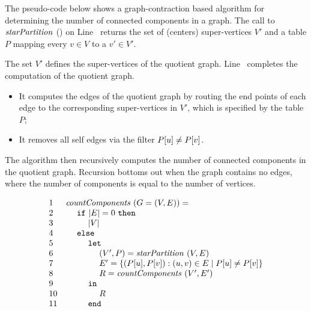 \begin{flex}
\begin{algorithm}
\label{alg:graphcon::connect::cc}

The pseudo-code below shows a graph-contraction based algorithm for
determining the number of connected components in a graph.
%
The call to $\mathit{starPartition}$ () on
Line~\linegcconnectccpartition{} returns the set of (centers)
super-vertices $V'$ and a table $P$ mapping every $v \in V$ to a $v'
\in V'$.
%


%
The set $V'$ defines the super-vertices of the quotient graph.
%
Line~\linegcconnectccedges{} completes the computation of the quotient
graph.
%
\begin{itemize}
\item It computes the edges of the quotient graph by 
routing the end points of each edge to the corresponding
super-vertices in $V'$, which is specified by the table $P$;
%
\item It  removes all self edges via the  filter $P[u]
\neq P[v]$.
%
\end{itemize}
%
The algorithm then recursively computes the number of connected components in the quotient graph.
%
Recursion bottoms out when the graph contains no edges, where the number of components is equal to the number of vertices.
%

\[
\begin{array}{ll}
1 & \cdvar{countComponents}~(G = (V,E)) =
\\ 
2 & ~~~~\cd{if}~|E| = 0~\cd{then}
\\
3 & ~~~~~~~~|V|
\\
4 & ~~~~\cd{else}
\\ 
5 & ~~~~~~~~\cd{let}
\\ 
6 & ~~~~~~~~~~~~(V',P) = \cdvar{starPartition}~(V,E)
\\
7 & ~~~~~~~~~~~~E' = \csetf{(\cget{P}{u},\cget{P}{v}) : (u,v) \in  E}{\cget{P}{u} \neq \cget{P}{v}} %
\\
8 & ~~~~~~~~~~~~R = \cdvar{countComponents}~(V',E')
\\
9 & ~~~~~~~~\cd{in}
\\
10 & ~~~~~~~~~~~~R
\\
11 & ~~~~~~~~\cd{end}
\end{array}
\]



\end{algorithm}
\end{flex}

